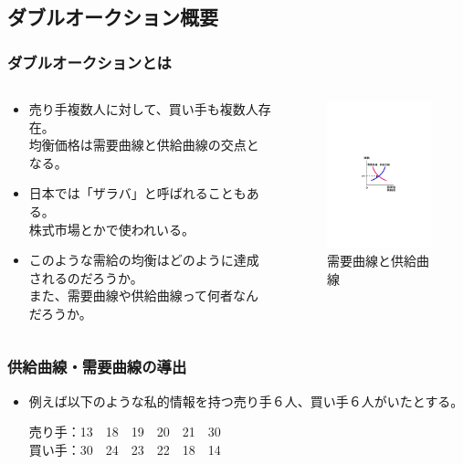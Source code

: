 \documentclass[dvipdfmx,12pt]{beamer}
\begin{document}
\subsection{ダブルオークション概要}
\begin{frame}
\frametitle{ダブルオークションとは}
\begin{columns}[t]
\begin{column}{0.6\textwidth} %
\begin{itemize}\setlength{\parskip}{0.5em}
\item<1->
売り手複数人に対して、買い手も複数人存在。\\
均衡価格は需要曲線と供給曲線の交点となる。
\item<2->
日本では「ザラバ」と呼ばれることもある。\\
株式市場とかで使われいる。
\item<3->
このような需給の均衡はどのように達成されるのだろうか。\\
また、需要曲線や供給曲線って何者なんだろうか。
\end{itemize}
\end{column}
\begin{column}{0.4\textwidth}
\begin{figure}
\centering
\includegraphics[width=50mm]{juyou-kyoukyu.pdf}
\caption{需要曲線と供給曲線}
\label{fig:jukyuu}
\end{figure}
\end{column}
\end{columns}
\end{frame}

\begin{frame}
\frametitle{供給曲線・需要曲線の導出}
\begin{itemize}\setlength{\parskip}{0.5em}
\item
例えば以下のような私的情報を持つ売り手６人、買い手６人がいたとする。

売り手：13　18　19　20　21　30\\
買い手：30　24　23　22　18　14
\end{itemize}
\end{frame}
\end{document}
